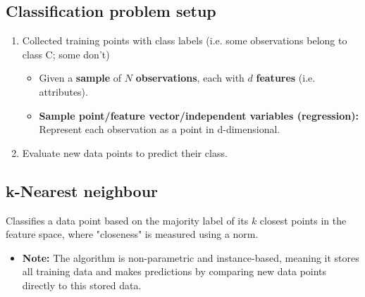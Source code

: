 \subsection{Classification problem setup}
\begin{definition}
    \begin{enumerate}
        \item Collected training points with class labels (i.e. some observations belong to class C; some don't)
        \begin{itemize}
            \item Given a \textbf{sample} of $N$ \textbf{observations}, each with $d$ \textbf{features} (i.e. attributes). 
            \item \textbf{Sample point/feature vector/independent variables (regression):} Represent each observation as a point in d-dimensional.
        \end{itemize}
        \item Evaluate new data points to predict their class.
    \end{enumerate}
\end{definition}

\subsection{k-Nearest neighbour}
\begin{definition}
    Classifies a data point based on the majority label of its $k$ closest points in the feature space, where "closeness" is measured using a norm. 
    \begin{itemize}
        \item \textbf{Note:} The algorithm is non-parametric and instance-based, meaning it stores all training data and makes predictions by comparing new data points directly to this stored data.
    \end{itemize}
\end{definition}

